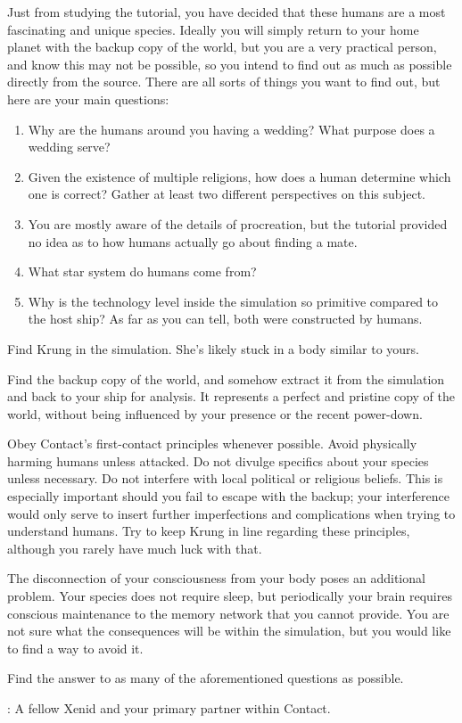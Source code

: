 \documentclass[char]{guildcamp1}
\begin{document}
Just from studying the tutorial, you have decided that these humans are a most fascinating and unique species. Ideally you will simply return to your home planet with the backup copy of the world, but you are a very practical person, and know this may not be possible, so you intend to find out as much as possible directly from the source. There are all sorts of things you want to find out, but here are your main questions:

\begin{enumerate}
\item Why are the humans around you having a wedding? What purpose does a wedding serve?
\item Given the existence of multiple religions, how does a human determine which one is correct? Gather at least two different perspectives on this subject.
\item You are mostly aware of the details of procreation, but the tutorial provided no idea as to how humans actually go about finding a mate.
\item What star system do humans come from?
\item Why is the technology level inside the simulation so primitive compared to the host ship? As far as you can tell, both were constructed by humans.
\end{enumerate}


\begin{itemz}[Goals]
  \item Find Krung in the simulation. She's likely stuck in a body similar to yours.
  \item Find the backup copy of the world, and somehow extract it from the simulation and back to your ship for analysis. It represents a perfect and pristine copy of the world, without being influenced by your presence or the recent power-down.
  \item Obey Contact's first-contact principles whenever possible. Avoid physically harming humans unless attacked. Do not divulge specifics about your species unless necessary. Do not interfere with local political or religious beliefs. This is especially important should you fail to escape with the backup; your interference would only serve to insert further imperfections and complications when trying to understand humans. Try to keep Krung in line regarding these principles, although you rarely have much luck with that.
  \item The disconnection of your consciousness from your body poses an additional problem. Your species does not require sleep, but periodically your brain requires conscious maintenance to the memory network that you cannot provide. You are not sure what the consequences will be within the simulation, but you would like to find a way to avoid it. %
  \item Find the answer to as many of the aforementioned questions as possible.
  
\end{itemz}

\begin{contacts}
  \contact{\cActive{}}: A fellow Xenid and your primary partner within Contact.
\end{contacts}
\end{document}

